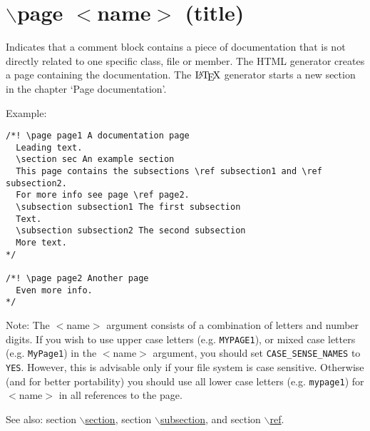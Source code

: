  \hypertarget{commands_cmdpage}{}\section{$\backslash$page $<$name$>$ (title)}\label{commands_cmdpage}
 Indicates that a comment block contains a piece of documentation that is not directly related to one specific class, file or member. The HTML generator creates a page containing the documentation. The $\mbox{\LaTeX}$ generator starts a new section in the chapter `Page documentation'.

\begin{Desc}
\item[Example:]

\begin{VerbInclude}\begin{verbatim}/*! \page page1 A documentation page
  Leading text.
  \section sec An example section
  This page contains the subsections \ref subsection1 and \ref subsection2.
  For more info see page \ref page2.
  \subsection subsection1 The first subsection
  Text.
  \subsection subsection2 The second subsection
  More text.
*/

/*! \page page2 Another page
  Even more info.
*/
\end{verbatim}
\end{VerbInclude}
 \end{Desc}
\begin{Desc}
\item[Note: ]The $<$name$>$ argument consists of a combination of letters and number digits. If you wish to use upper case letters (e.g. {\tt MYPAGE1}), or mixed case letters (e.g. {\tt MyPage1}) in the $<$name$>$ argument, you should set {\tt CASE\_\-SENSE\_\-NAMES} to {\tt YES}. However, this is advisable only if your file system is case sensitive. Otherwise (and for better portability) you should use all lower case letters (e.g. {\tt mypage1}) for $<$name$>$ in all references to the page.\end{Desc}
\begin{Desc}
\item[See also:]section \hyperlink{commands_cmdsection}{$\backslash$section}, section \hyperlink{commands_cmdsubsection}{$\backslash$subsection}, and section \hyperlink{commands_cmdref}{$\backslash$ref}.\end{Desc}


